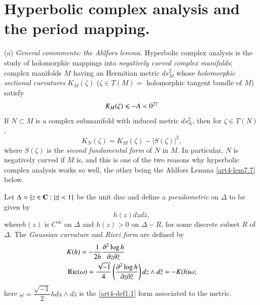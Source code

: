 \section{Hyperbolic complex analysis and the period mapping.}\label{art4-sec7}
(a) \textit{General commments: the Ahlfors lemma.} Hyperbolic complex analysis is the study of holomorphic mappings into \textit{negatively curved complex manifolds}; \ie complex manifolds $M$ having an Hermitian metric $ds^2_M$ whose \textit{holomorphic sectional curvatures} $K_M (\zeta)$ ($\zeta \in T (M) =$ holomorphic tangent bundle of $M$) satisfy
\setcounter{equation}{0}
\begin{equation}\label{art4-eq7.1}
K_M (\zeta) \leqslant - A < 0\footnotemark[27]{}
\end{equation}
If $N \subset M$ is a complex submanifold with induced metric $ds^2_N$, then for $\zeta \in T (N)$,
\begin{equation}
K_N (\zeta) = K_M (\zeta) - |S(\zeta)|^2, 
\label{art4-eq7.2}
\end{equation}
where $S (\zeta)$ is the \textit{second fundamental form} of $N$ in $M$. In particular, $N$ is negatively curved if $M$ is, and this is one of the two reasons why hyperbolic complex analysis works so well, the other being the Ahlfors Lemma \ref{art4-lem7.7} below.

Let $\Delta = \{z \in \mathbf{C} : |z| < 1\}$ be the unit disc and define a \textit{pseudometric} on $\Delta$ to be given by 
\begin{equation}
h(z) dz d\bar{z}, \label{art4-eq7.3}
\end{equation}
where\pageoriginale $h(z)$ is $C^\infty$ on $\Delta$ and $h(z) >0$ on $\Delta -R$, for some discrete subset $R$ of $\Delta$. The \textit{Gaussian curvature} and \textit{Ricci form} are defined by
\begin{align}
& K(h) = - \frac{1}{2h} \frac{\partial^2 \log h}{\partial z \partial \bar{z}} \notag\\
& \operatorname{Ric} (\omega) = \frac{\sqrt{-1}}{4} \left( \frac{\partial^2 \log h}{\partial z \partial \bar{z}}\right) dz \wedge d\bar{z} = - K (h) \omega;  \label{art4-eq7.4}
\end{align}
here $\omega = \dfrac{\sqrt{-1}}{2} h dz \wedge d\bar{z}$ is the \eqref{art4-def1.1} form associated to the metric.

